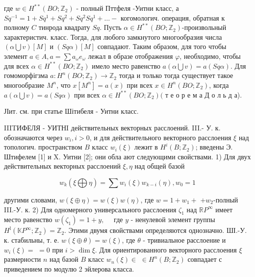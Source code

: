 \documentclass[10pt]{article}
\begin{document}
где $w \in H^{* *}\left(B O ; \mathbb{Z}_{2}\right)$ - полный Пттфеля -Уитни класс, а $S q^{-1}=1+S q^{1}+S q^{2}+S q^{2} S q^{1}+\ldots-$ когомологич. операция, обратная к полному $C$ тинрода квадрату $S q$. Пусть $\alpha \in H^{* *}\left(B O ; \mathbb{Z}_{2}\right)$-произвольный характеристич. класс. Тогда, для любого замкнутого многообразия числа $(\alpha \bigcup v)[M]$ и $(S q \alpha)[M]$ совпадают. Таким образом, для того чтобы элемент $a \in A, a=\sum a_{\omega} e_{\omega}$ лежал в образе отображения $\varphi$, необходимо, чтобы для всех $\alpha \in H^{* *}\left(B O ; \mathbb{Z}_{2}\right)$ имело место равенство $a(\alpha \bigcup v)=a(S q \alpha)$. Для гомоморфігзма $a: H^{n}\left(B O ; \mathbb{Z}_{2}\right) \longrightarrow \mathbb{Z}_{2}$ тогда и только тогда существует такое многообразие $M^{n}$, что $x\left[M^{n}\right]=a(x)$ при всех $x \in H^{n}\left(B O ; \mathbb{Z}_{2}\right)$, когда $a(\alpha \bigcup v)=a(S q \alpha)$ при всех $\alpha \in H^{* *}\left(B O ; \mathbb{Z}_{2}\right)($ т е о р е м а Д о л ь д а).



ЈІит. см. при статье Шітибеля - Уитни класс.



IIITИФЕЛЯ - УИТНI действительных векторных расслоений. III.- У. к. обозначаются через $w_{i}, i>0$, и для действительного векторного расслоения $\xi$ над топологич. пространством $B$ класс $w_{i}(\xi)$ лежит в $H^{i}\left(B ; \mathbb{Z}_{2}\right)$; введены Э. Штифелем [1] и X. Уитни [2]; они обла ают следующими свойствами. 1) Для двух действительных векторных расслоений $\xi, \eta$ над общей базой



\[

w_{k}(\xi \bigoplus \eta)=\sum w_{i}(\xi) w_{k-i}(\eta), w_{0}=1

\]



другими словами, $w(\xi \oplus \eta)=w(\xi) w(\eta)$, где $w=1+w_{1}+$ $+w_{2}$-полный III.-У. к. 2) Для одномерного универсального расслоения $\zeta_{1}$ над $\mathbb{R} P^{\infty}$ имеет место равенство $w\left(\zeta_{1}\right)=1+y, \quad$ где $y$ - ненулевой элемент группы $H^{\mathrm{l}}\left(\mathbb{K} P^{\infty} ; \mathbb{Z}_{2}\right)=\mathbb{Z}_{2}$. Этими двумя свойствами определяются однозначно. ШІ.-У. к. стабильны, т. е. $w(\xi \oplus \theta)=w(\xi)$, где $\theta$ - тривиальное расслоение и $w_{i}(\xi)=$ $=0$ при $i>\operatorname{dim} \xi$. Для ориентированного векторного расслоения $\xi$ размерности $n$ над базой $B$ класс $w_{n}(\xi) \in$ $\in H^{n}\left(B ; \mathbb{Z}_{2}\right)$ совпадает с приведением по модулю 2 эйлерова класса.
\end{document}
